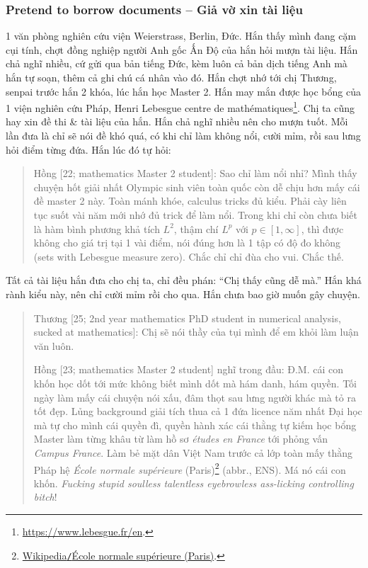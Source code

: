 \documentclass[12pt]{article}
\begin{document}
\subsubsection{Pretend to borrow documents -- Giả vờ xin tài liệu}
1 văn phòng nghiên cứu viện Weierstrass, Berlin, Đức. Hắn thấy mình đang cặm cụi tính, chợt đồng nghiệp người Anh gốc Ấn Độ của hắn hỏi mượn tài liệu. Hắn chả nghĩ nhiều, cứ gửi qua bản tiếng Đức, kèm luôn cả bản dịch tiếng Anh mà hắn tự soạn, thêm cả ghi chú cá nhân vào đó. Hắn chợt nhớ tới chị Thương, senpai trước hắn 2 khóa, lúc hắn học Master 2. Hắn may mắn được học bổng của 1 viện nghiên cứu Pháp, Henri Lebesgue centre de math\'ematiques\footnote{\url{https://www.lebesgue.fr/en}.}. Chị ta cũng hay xin đề thi \& tài liệu của hắn. Hắn chả nghĩ nhiều nên cho mượn tuốt. Mỗi lần đưa là chỉ sẽ nói đề khó quá, có khi chỉ làm không nổi, cười mỉm, rồi sau lưng hỏi điểm từng đứa. Hắn lúc đó tự hỏi:
\begin{quote}
	{\sf Hồng [22; mathematics Master 2 student]}: Sao chỉ làm nổi nhỉ? Mình thấy chuyện hốt giải nhất Olympic sinh viên toàn quốc còn dễ chịu hơn mấy cái đề master 2 này. Toàn mánh khóe, calculus tricks đủ kiểu. Phải cày liên tục suốt vài năm mới nhớ đủ trick để làm nổi. Trong khi chỉ còn chưa biết là hàm bình phương khả tích $L^2$, thậm chí $L^p$ với $p\in[1,\infty]$, thì được không cho giá trị tại 1 vài điểm, nói đúng hơn là 1 tập có độ đo không (sets with Lebesgue measure zero). Chắc chỉ chỉ đùa cho vui. Chắc thế.
\end{quote}
Tất cả tài liệu hắn đưa cho chị ta, chỉ đều phán: ``Chị thấy cũng dễ mà.'' Hắn khá rành kiểu này, nên chỉ cười mỉm rồi cho qua. Hắn chưa bao giờ muốn gây chuyện.
\begin{quote}
	{\sf Thương [25; 2nd year mathematics PhD student in numerical analysis, sucked at mathematics]}: Chị sẽ nói thầy của tụi mình để em khỏi làm luận văn luôn.
	
	{\sf Hồng [23; mathematics Master 2 student]} nghĩ trong đầu: Đ.M. cái con khốn học dốt tới mức không biết mình dốt mà hám danh, hám quyền. Tối ngày làm mấy cái chuyện nói xấu, đâm thọt sau lưng người khác mà tỏ ra tốt đẹp. Lủng background giải tích thua cả 1 đứa licence năm nhất Đại học mà tự cho mình cái quyền đì, quyền hành xác cái thằng tự kiếm học bổng Master làm từng khâu từ làm hồ sơ {\it \'etudes en France} tới phỏng vấn {\it Campus France}. Làm bẻ mặt dân Việt Nam trước cả lớp toàn mấy thằng Pháp hệ {\it École normale supérieure} (Paris)\footnote{\href{https://en.wikipedia.org/wiki/Ecole_normale_superieure_(Paris)}{Wikipedia{\tt/}École normale supérieure (Paris)}.} (abbr., ENS). Má nó cái con khốn. {\it Fucking stupid soulless talentless eyebrowless ass-licking controlling bitch}!
\end{quote}
\end{document}
